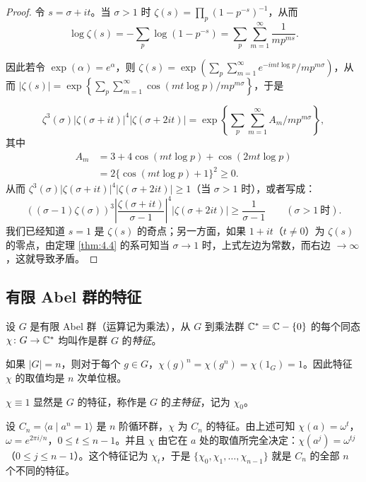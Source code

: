 \begin{proof}
令 $s=\sigma+it$。当 $\sigma>1$ 时 $\zeta(s)=\prod_p(1-p^{-s})^{-1}$，从而
\[
  \log\zeta(s)=-\sum_p\log(1-p^{-s})=\sum_p\sum_{m=1}^{\infty}\frac{1}{mp^{ms}}.
\]
\begin{sloppypar}
因此若令 $\exp(\alpha)=e^{\alpha}$，则 $\zeta(s)=\exp\left(\sum_p\sum_{m=1}^{\infty}e^{-imt\log p}/mp^{m\sigma}\right)$，从而 $|\zeta(s)|=\exp\left\{\sum_p\sum_{m=1}^{\infty}\cos(mt\log p)/mp^{m\sigma}\right\}$，于是
\end{sloppypar}
\[
  \zeta^3(\sigma)|\zeta(\sigma+it)|^4|\zeta(\sigma+2it)|
  =\exp\left\{\sum_p\sum_{m=1}^{\infty}A_m/mp^{m\sigma}\right\},
\]
其中
\begin{align*}
  A_m&=3+4\cos(mt\log p)+\cos(2mt\log p)\\
  &=2\{\cos(mt\log p)+1\}^2\geqslant 0.
\end{align*}
从而 $\zeta^3(\sigma)|\zeta(\sigma+it)|^4|\zeta(\sigma+2it)|\geqslant 1$（当 $\sigma>1$ 时），或者写成：
\[
  ((\sigma-1)\zeta(\sigma))^3\left|\frac{\zeta(\sigma+it)}{\sigma-1}\right|^4|\zeta(\sigma+2it)|
  \geqslant\frac{1}{\sigma-1}\qquad(\sigma>1\ \text{时}).
\]
我们已经知道 $s=1$ 是 $\zeta(s)$ 的奇点；另一方面，如果 $1+it$（$t\neq 0$）为 $\zeta(s)$ 的零点，由定理 \ref{thm:4.4} 的系可知当 $\sigma\to1$ 时，上式左边为常数，而右边 $\to\infty$，这就导致矛盾。
\end{proof}

\subsection{有限 Abel 群的特征}\label{sec:ch4-s2-2}

\begin{definition}\label{def:ch4-3}
设 $G$ 是有限 Abel 群（运算记为乘法），从 $G$ 到乘法群 $\mathbb{C}^*=\mathbb{C}-\{0\}$ 的每个同态 $\chi\colon G\to\mathbb{C}^*$ 均叫作是群 $G$ 的\emph{特征}。
\end{definition}

如果 $|G|=n$，则对于每个 $g\in G$，$\chi(g)^n=\chi(g^n)=\chi(1_G)=1$。因此特征 $\chi$ 的取值均是 $n$ 次单位根。

\begin{example}
$\chi\equiv 1$ 显然是 $G$ 的特征，称作是 $G$ 的\emph{主特征}，记为 $\chi_0$。
\end{example}

\begin{example}
设 $C_n=\langle a\mid a^n=1\rangle$ 是 $n$ 阶循环群，$\chi$ 为 $C_n$ 的特征。由上述可知 $\chi(a)=\omega^t$，$\omega=e^{2\pi i/n}$，$0\leqslant t\leqslant n-1$。并且 $\chi$ 由它在 $a$ 处的取值所完全决定：$\chi(a^j)=\omega^{tj}$（$0\leqslant j\leqslant n-1$）。这个特征记为 $\chi_t$，于是 $\{\chi_0,\chi_1,\dots,\chi_{n-1}\}$ 就是 $C_n$ 的全部 $n$ 个不同的特征。
\end{example}

